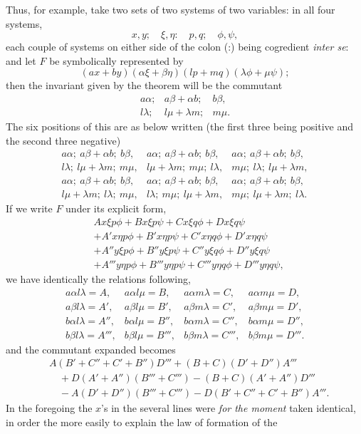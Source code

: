 \documentclass[11pt]{article}
\newcommand{\sourcepage}[1]{\marginpar{\scriptsize p.~#1}}
\begin{document}
{{\sourcepage{313}
Thus, for example, take two sets of two systems of two variables: in all four systems,
\[
x,y;\quad \xi,\eta:\quad p,q;\quad \phi,\psi,
\]
each couple of systems on either side of the colon (:) being cogredient \emph{inter se}: and let $F$ be symbolically represented by
\[
(ax+by)(\alpha\xi+\beta\eta)(lp+mq)(\lambda\phi+\mu\psi);
\]
then the invariant given by the theorem will be the commutant
\[
\begin{array}{ccc}
a\alpha;&a\beta+\alpha b;&b\beta,\\
l\lambda;&l\mu+\lambda m;&m\mu.
\end{array}
\]
The six positions of this are as below written (the first three being positive and the second three negative)
\[
\begin{array}{ccc}
a\alpha;\ a\beta+\alpha b;\ b\beta,&
a\alpha;\ a\beta+\alpha b;\ b\beta,&
a\alpha;\ a\beta+\alpha b;\ b\beta,\\
l\lambda;\ l\mu+\lambda m;\ m\mu,&
l\mu+\lambda m;\ m\mu;\ l\lambda,&
m\mu;\ l\lambda;\ l\mu+\lambda m,\\[0.4em]
a\alpha;\ a\beta+\alpha b;\ b\beta,&
a\alpha;\ a\beta+\alpha b;\ b\beta,&
a\alpha;\ a\beta+\alpha b;\ b\beta,\\
l\mu+\lambda m;\ l\lambda;\ m\mu,&
l\lambda;\ m\mu;\ l\mu+\lambda m,&
m\mu;\ l\mu+\lambda m;\ l\lambda.
\end{array}
\]
If we write $F$ under its explicit form,
\[
\begin{aligned}
&Ax\xi p\phi+Bx\xi p\psi+Cx\xi q\phi+Dx\xi q\psi\\
&+A'x\eta p\phi+B'x\eta p\psi+C'x\eta q\phi+D'x\eta q\psi\\
&+A''y\xi p\phi+B''y\xi p\psi+C''y\xi q\phi+D''y\xi q\psi\\
&+A'''y\eta p\phi+B'''y\eta p\psi+C'''y\eta q\phi+D'''y\eta q\psi,
\end{aligned}
\]
we have identically the relations following,
\[
\begin{array}{llll}
a\alpha l\lambda=A,&a\alpha l\mu=B,&a\alpha m\lambda=C,&a\alpha m\mu=D,\\
a\beta l\lambda=A',&a\beta l\mu=B',&a\beta m\lambda=C',&a\beta m\mu=D',\\
b\alpha l\lambda=A'',&b\alpha l\mu=B'',&b\alpha m\lambda=C'',&b\alpha m\mu=D'',\\
b\beta l\lambda=A''',&b\beta l\mu=B''',&b\beta m\lambda=C''',&b\beta m\mu=D'''.
\end{array}
\]
and the commutant expanded becomes
\[
\begin{aligned}
&A(B'+C''+C'+B'')D'''+(B+C)(D'+D'')A'''\\
&\quad+D(A'+A'')(B'''+C''')-(B+C)(A'+A'')D'''\\
&\quad-A(D'+D'')(B'''+C''')-D(B'+C''+C'+B'')A'''.
\end{aligned}
\]
In the foregoing the $x$'s in the several lines were \emph{for the moment} taken identical, in order the more easily to explain the law of formation of the

}}
\end{document}
